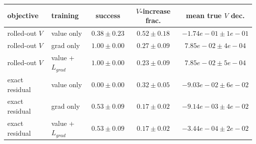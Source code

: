 \begin{tabular}{llccc}
\toprule
objective & training & success & $V$-increase frac. & mean true $V$ dec. \\
\midrule
rolled-out $V$ & value only & $0.38\pm0.23$ & $0.52\pm0.18$ & $-1.74e-01\pm1e-01$ \\
rolled-out $V$ & grad only & $1.00\pm0.00$ & $0.27\pm0.09$ & $7.85e-02\pm4e-04$ \\
rolled-out $V$ & value +$L_{grad}$ & $1.00\pm0.00$ & $0.23\pm0.09$ & $7.85e-02\pm5e-04$ \\
\midrule
exact residual & value only & $0.00\pm0.00$ & $0.32\pm0.05$ & $-9.03e-02\pm6e-02$ \\
exact residual & grad only & $0.53\pm0.09$ & $0.17\pm0.02$ & $-9.14e-03\pm4e-02$ \\
exact residual & value +$L_{grad}$ & $0.53\pm0.09$ & $0.17\pm0.02$ & $-3.44e-04\pm2e-02$ \\
\bottomrule
\end{tabular}
